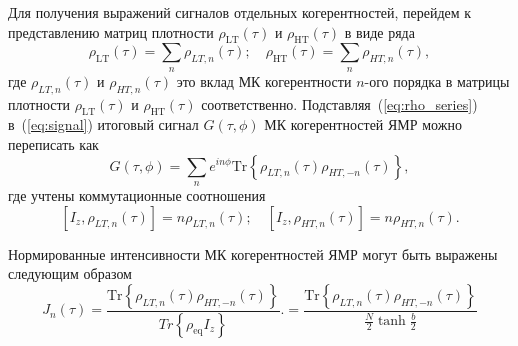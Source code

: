 Для получения выражений сигналов отдельных когерентностей,
перейдем к представлению матриц плотности
$\rho_\mathrm{LT} (\tau)$ и $\rho_\mathrm{HT} (\tau)$
в виде ряда
%
\begin{equation}\label{eq:rho_series}
  \rho_\mathrm{LT} (\tau) = \sum_n \rho_{LT, n}(\tau); \quad
  \rho_\mathrm{HT} (\tau) = \sum_n \rho_{HT, n}(\tau),
\end{equation}
%
где $\rho_{LT, n} (\tau)$ и  $\rho_{HT, n} (\tau)$
это вклад МК когерентности $n$-ого порядка
в матрицы плотности $\rho_\mathrm{LT} (\tau)$ и $\rho_\mathrm{HT} (\tau)$ соответственно.
Подставляя~(\ref{eq:rho_series}) в~(\ref{eq:signal}) итоговый сигнал $G(\tau, \phi)$ МК когерентностей ЯМР можно переписать как
%
\begin{equation}
    \label{eq:signal_series}
    G(\tau, \phi) = \sum\limits_n
    e^{in\phi}\mathrm{Tr} \left\{
    \rho_{LT, n}(\tau) \rho_{HT, -n} (\tau)
    \right\},
\end{equation}
%
где учтены коммутационные соотношения
%
\begin{equation}
    \left[I_z, \rho_{LT, n} (\tau) \right] = n  \rho_{LT, n} (\tau);
    \quad
    \left[I_z, \rho_{HT, n} (\tau) \right] = n  \rho_{HT, n} (\tau).
\end{equation}

Нормированные интенсивности МК когерентностей ЯМР могут быть выражены следующим образом
%
\begin{equation}
    \label{eq:coherence}
    J_n(\tau)
    = \dfrac{
       \mathrm{Tr} \left\{
        \rho_{LT, n}(\tau) \rho_{HT, -n} (\tau)
        \right\}
    }{Tr \left\{\rho_{\mathrm{eq}}I_z\right\}}.
    = \dfrac{
       \mathrm{Tr} \left\{
        \rho_{LT, n}(\tau) \rho_{HT, -n} (\tau)
        \right\}
    }{\frac N 2 \tanh \frac b 2}
\end{equation}

